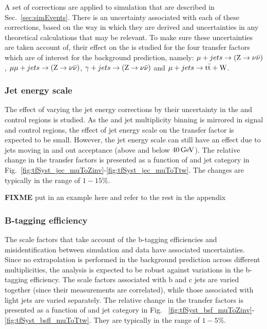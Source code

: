 A set of corrections are applied to simulation that are described in
Sec.~\ref{sec:simEvents}. There is an uncertainty associated with each
of these corrections, based on the way in which they are derived and
uncertainties in any theoretical calculations that may be relevant. To
make sure these uncertainties are taken account of, their effect on
the \TFs is studied for the four transfer factors which are of interest 
for the background prediction, namely: $\mu + jets \rightarrow ({\text Z} \rightarrow \nu\bar{\nu})$,
$\mu\mu + jets \rightarrow ({\text Z} \rightarrow \nu\bar{\nu})$, $\gamma + jets \rightarrow ({\text Z} \rightarrow \nu\bar{\nu})$ and $\mu + jets
\rightarrow \mathrm{t\bar{t}+W}$. 


\subsubsection*{Jet energy scale}
\label{sec:tfSyst_jec}
The effect of varying the jet energy corrections by their uncertainty
in the \mj and \mmj control regions is studied.  As the \scalht and
jet multiplicity binning is mirrored in signal and control regions,
the effect of jet energy scale on the transfer factor is expected to
be small.  However, the jet energy scale can still have an effect due
to jets moving in and out acceptance (above and below $40\mathrm{\,Ge\kern -0.1em V}$). The
relative change in the transfer factors is presented as a function of
\scalht and jet category in
Fig.~\ref{fig:tfSyst_jec_muToZinv}-\ref{fig:tfSyst_jec_muToTtw}.  The
changes are typically in the range of $1-15\%$.

{\bf FIXME} put in an example here and refer to the rest in the
appendix

\subsubsection*{B-tagging efficiency}
\label{sec:tfSyst_btag}
The scale factors that take account of the b-tagging efficiencies and
misidentification between simulation and data have associated
uncertainties.  Since no extrapolation is performed in the background
prediction across different \nb multiplicities, the analysis is
expected to be robust against variations in the b-tagging efficiency.
The scale factors associated with b and c jets are varied together
(since their measurements are correlated), while those associated with
light jets are varied separately.  The relative change in the transfer
factors is presented as a function of \scalht and jet category in Fig.
~\ref{fig:tfSyst_bsf_muToZinv}-\ref{fig:tfSyst_bsfl_muToTtw}.  They
are typically in the range of $1-5\%$.


